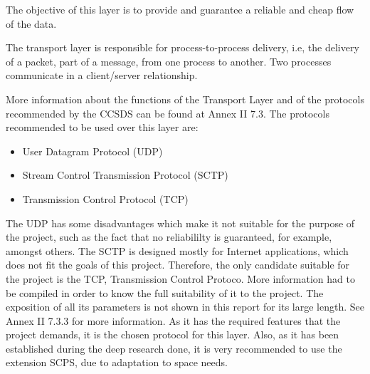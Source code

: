 %
%
%
%
%



The objective of this layer is to provide and guarantee a reliable and cheap flow of the data. 

The transport layer is responsible for process-to-process delivery, i.e, the delivery of a packet, part of a message, from one process to another. Two processes communicate in a client/server relationship. 

More information about the functions of the Transport Layer and of the protocols recommended by the CCSDS can be found at Annex II 7.3.
The protocols recommended to be used over this layer are:
\begin{itemize}
\item User Datagram Protocol (UDP)
\item Stream Control Transmission Protocol (SCTP)
\item Transmission Control Protocol (TCP)
\end{itemize}
The UDP has some disadvantages which make it not suitable for the purpose of the project, such as the fact that no reliabililty is guaranteed, for example, amongst others. The SCTP is designed mostly for Internet applications, which does not fit the goals of this project. Therefore, the only candidate suitable for the project is the TCP, Transmission Control Protoco. More information had to be compiled in order to know the full suitability of it to the project. The exposition of all its parameters is not shown in this report for its large length. See Annex II 7.3.3 for more information.  As it has the required features that the project demands, it is the chosen protocol for this layer. Also, as it has been established during the deep research done, it is very recommended to use the extension SCPS, due to adaptation to space needs.  

%
